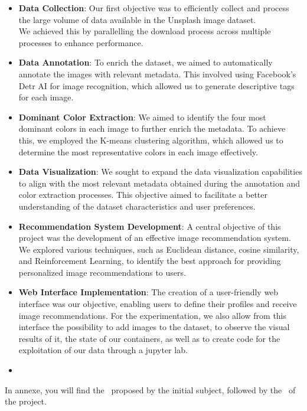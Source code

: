 \documentclass{article}
\begin{document}
    \begin{itemize}
        \item \textbf{Data Collection}: Our first objective was to efficiently collect and process the large volume of data available in the Unsplash image dataset.\\We achieved this by parallelling the download process across multiple processes to enhance performance.
        \item \textbf{Data Annotation}: To enrich the dataset, we aimed to automatically annotate the images with relevant metadata. This involved using Facebook's Detr AI for image recognition, which allowed us to generate descriptive tags for each image.
        \item \textbf{Dominant Color Extraction}: We aimed to identify the four most dominant colors in each image to further enrich the metadata. To achieve this, we employed the K-means clustering algorithm, which allowed us to determine the most representative colors in each image effectively.
        \item \textbf{Data Visualization}: We sought to expand the data visualization capabilities to align with the most relevant metadata obtained during the annotation and color extraction processes. This objective aimed to facilitate a better understanding of the dataset characteristics and user preferences.
        \item \textbf{Recommendation System Development}: A central objective of this project was the development of an effective image recommendation system. We explored various techniques, such as Euclidean distance, cosine similarity, and Reinforcement Learning, to identify the best approach for providing personalized image recommendations to users.
        \item \textbf{Web Interface Implementation}: The creation of a user-friendly web interface was our objective, enabling users to define their profiles and receive image recommendations. For the experimentation, we also allow from this interface the possibility to add images to the dataset, to observe the visual results of it, the state of our containers, as well as to create code for the exploitation of our data through a jupyter lab.
        \item
    \end{itemize}

    In annexe, you will find the~\hyperref[subsec:target_architecture]{} proposed by the initial subject, followed by the~\hyperref[subsec:actual_architecture]{} of the project.
\end{document}
